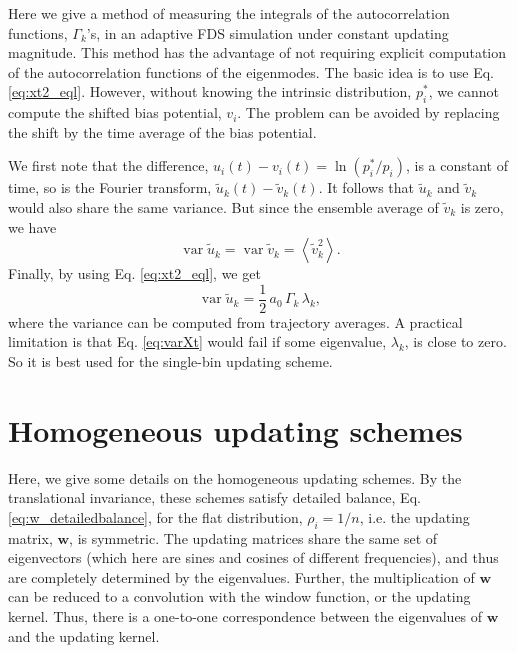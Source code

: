 \documentclass[reprint, superscriptaddress, floatfix]{revtex4-1}
\begin{document}
Here we give a method of measuring
the integrals of the autocorrelation functions, $\Gamma_k$'s,
in an adaptive FDS simulation
under constant updating magnitude.
%
This method has the advantage of not requiring
explicit computation of 
the autocorrelation functions of the eigenmodes.
%
The basic idea is to use Eq. \eqref{eq:xt2_eql}.
%
However,
without knowing the intrinsic distribution, $p^*_i$,
we cannot compute the shifted bias potential, $v_i$.
%
The problem can be avoided by replacing the shift
by the time average of the bias potential.

We first note that the difference, 
$u_i(t) - v_i(t) = \ln(p^*_i/p_i)$, is a constant of time,
so is the Fourier transform,
$\tilde u_k(t) - \tilde v_k(t)$.
%
It follows that
${\tilde u}_{k}$ and ${\tilde v}_{k}$ would also share the same variance.
%
But since the ensemble average of ${\tilde v}_{k}$
is zero, we have
\begin{equation*}
  \operatorname{var} {\tilde u}_{k}
  =
  \operatorname{var} {\tilde v}_{k}
  =
  \left\langle {\tilde v}_{k}^2 \right\rangle
  .
\end{equation*}
%
Finally, by using Eq. \eqref{eq:xt2_eql},
we get
%
\begin{equation}
  \operatorname{var} {\tilde u}_k
  =
  \frac{1}{2} \,
  a_0 \, \Gamma_k \, \lambda_k,
\label{eq:varXt}
\end{equation}
%
where the variance can be computed from trajectory averages.
%
A practical limitation is that Eq. \eqref{eq:varXt}
would fail if some eigenvalue, $\lambda_k$, is close to zero.
So it is best used for the single-bin updating scheme.




\section{\label{sec:more_wband}
Homogeneous updating schemes
}


Here, we give some details
on the homogeneous updating schemes.
%
By the translational invariance,
these schemes
satisfy detailed balance,
Eq. \eqref{eq:w_detailedbalance},
for the flat distribution, $\rho_i = 1/n$,
i.e. the updating matrix, $\mathbf w$,
is symmetric.
%
The updating matrices
share the same set of eigenvectors
(which here are sines and cosines of different frequencies),
and thus are completely determined
by the eigenvalues.
%
Further, the multiplication of $\mathbf w$
can be reduced to a convolution with the window function,
or the updating kernel.
%
Thus,
there is a one-to-one correspondence between
the eigenvalues of $\mathbf w$
and the updating kernel.
\end{document}
